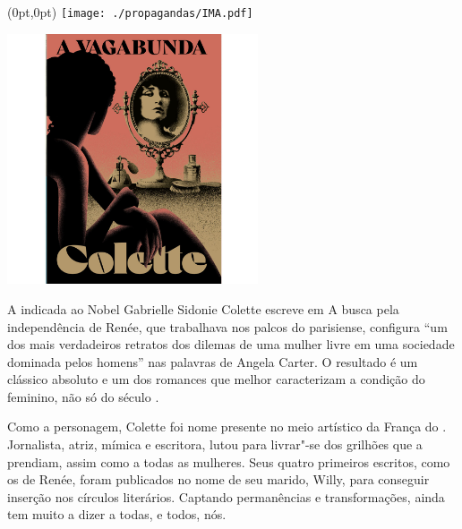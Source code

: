 \pagestyle{ima}
\label{ima}

\begin{textblock*}{5.625in}(0pt,0pt)%
\vspace*{-3.5cm}
\hspace*{-2.77cm}\texttt{[image: ./propagandas/IMA.pdf]}
\end{textblock*}

\pagebreak %

\begin{center}
\hspace*{-3.6cm}
\hspace*{3.1cm}\includegraphics[width=74mm]{./grid/vagabond.jpg}
\end{center}

\hspace*{-7cm}\hrulefill\hspace*{-7cm}

\medskip

\noindent{}A indicada ao Nobel Gabrielle Sidonie Colette escreve em {}  A busca pela independência de Renée, que trabalhava nos palcos do {} parisiense, configura “um dos mais verdadeiros retratos dos dilemas de uma mulher livre em uma sociedade dominada pelos homens” nas palavras de Angela Carter. O resultado é um clássico absoluto e um dos romances que melhor caracterizam a condição do feminino, não só do século .

Como a personagem, Colette foi nome presente no meio artístico da França do . Jornalista, atriz, mímica e escritora, lutou para livrar"-se dos grilhões que a prendiam, assim como a todas as mulheres. Seus quatro primeiros escritos, como os de Renée, foram publicados no nome de seu marido, Willy, para conseguir inserção nos círculos literários. Captando permanências e transformações, {} ainda tem muito a dizer a todas, e todos, nós.

